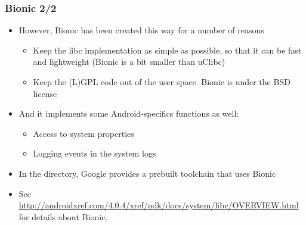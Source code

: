 \begin{frame}
  \frametitle{Bionic 2/2}
  \begin{itemize}
  \item However, Bionic has been created this way for a number of
    reasons
    \begin{itemize}
    \item Keep the libc implementation as simple as possible, so that
      it can be fast and lightweight (Bionic is a bit smaller than
      uClibc)
    \item Keep the (L)GPL code out of the user space. Bionic is under
      the BSD license
    \end{itemize}
  \item And it implements some Android-specifics functions as well:
    \begin{itemize}
    \item Access to system properties
    \item Logging events in the system logs
    \end{itemize}
  \item In the  directory, Google provides a prebuilt toolchain
    that uses Bionic
  \item See
    \url{http://androidxref.com/4.0.4/xref/ndk/docs/system/libc/OVERVIEW.html}
    for details about Bionic.
  \end{itemize}
\end{frame}
